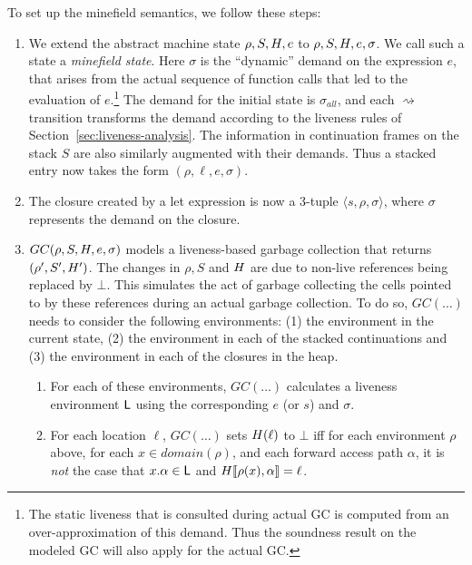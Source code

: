 \documentclass[9pt,preprint,letter,nonatbib]{sigplanconf}
\newcommand{\added}[1]{#1}
\begin{document}
\noindent To set up the minefield semantics, we follow these steps:
\begin{enumerate}

\item  We  extend  the  abstract  machine  state  $\rho,S,H,e$  to
  $\rho,S,H,e,\sigma$.   We call  such a  state a  \emph{minefield
  state}.  Here $\sigma$  is the ``dynamic'' demand  on the expression
  $e$, that arises from the actual sequence of function calls that led
  to  the  evaluation of  $e$.\footnote{The  static  liveness that  is
    consulted during actual GC  is computed from an over-approximation
    of this demand.  Thus the soundness  result on the modeled GC will
    also apply for the actual GC.} The demand for the initial state is
  $\sigma_{\mathit  {all}}$,  and each  $\rightsquigarrow$  transition
  transforms   the  demand   according  to   the  liveness   rules  of
  Section~\ref{sec:liveness-analysis}.      The     information     in
  continuation frames  on the stack  $S$ are also  similarly augmented
  with their demands.  Thus a stacked entry now takes the form $(\rho,
  \ell, e, \sigma)$.

\item The closure created by a let expression is now a 3-tuple
  $\langle s,  \rho, \sigma \rangle$, where $\sigma$ represents the
  demand on the closure. 

\item  $GC(\rho,  S,  H,  e, \sigma)$ models  a  liveness-based  garbage
  collection that returns $(\rho', S', H')$. The changes in
  $\rho, S$ and  $H$ are due
  to non-live references being replaced by $\bot$.  This simulates the
  act of  garbage collecting  the cells
  pointed to by these references  during an actual garbage collection.
  To do so, $GC(\ldots)$ needs to consider the following environments:  (1) the  environment in  the
  current state, (2) the  environment in each of the stacked  continuations and (3)
  the environment  in each of  the closures in  the heap.
  
 \begin{enumerate} 
\added{

 \item \label{env}  For each of  these environments, $GC(\ldots)$  calculates a
   liveness  environment $\mathsf{L}$  using  the  corresponding  $e$  (or  $s$)  and
   $\sigma$.
 \item 
   For each
    location $\ell$,  $GC(\ldots)$  sets $H(\ell)$  to $\bot$ iff for each
    environment $\rho$ above, for each $x \in domain(\rho)$, and each forward
    access
    path $\alpha$, it is \emph{not} the case that $x.\alpha \in \mathsf{L}$ and $H\llbracket\rho(x), \alpha
    \rrbracket = \ell$. 
}


\end{enumerate}
\end{enumerate}
\end{document}
